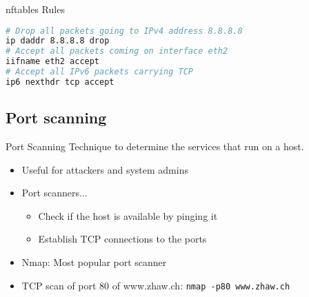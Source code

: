 \begin{examplecode}{nftables Rules}
\begin{lstlisting}[language=bash, style=basesmol]
# Drop all packets going to IPv4 address 8.8.8.8
ip daddr 8.8.8.8 drop
# Accept all packets coming on interface eth2
iifname eth2 accept
# Accept all IPv6 packets carrying TCP
ip6 nexthdr tcp accept
\end{lstlisting}
\end{examplecode}

\subsection{Port scanning}

\begin{definition}{Port Scanning}
    Technique to determine the services that run on a host.
    \begin{itemize}
        \item Useful for attackers and system admins
        \item Port scanners...
        \begin{itemize}
            \item Check if the host is available by pinging it
            \item Establish TCP connections to the ports
        \end{itemize}
        \item Nmap: Most popular port scanner
        \item TCP scan of port 80 of www.zhaw.ch: \texttt{nmap -p80 www.zhaw.ch}
    \end{itemize}
\end{definition}